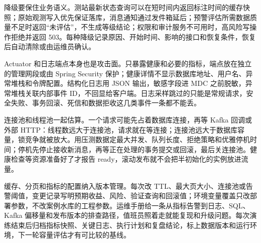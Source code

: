 降级要保住业务语义。测站最新状态查询可以在短时间内返回标注时间的缓存快照；原始观测写入优先保证落库，消息通知通过发件箱延后；预警评估所需数据质量不足时返回“未评估”，不生成等级结论；权限和审计服务不可用时，高风险写操作拒绝并返回 503。每种降级记录原因、开始时间、影响的接口和恢复条件，恢复后自动清除或由运维员确认。

Actuator 和日志端点本身也是攻击面。只暴露健康和必要的指标，端点放在独立的管理网段或由 Spring Security 保护；健康详情不显示数据库地址、用户名、异常堆栈和令牌配置。结构化日志用 JSON 输出，敏感字段进 MDC 之前脱敏，异常堆栈关联内部事件 ID，不回显给客户端。日志采样跳过的只能是常规请求，安全失败、事务回滚、死信和数据拒收这几类事件一条都不能丢。

连接池和线程池一起估算。一个请求可能先占着数据库连接，再等 Kafka 回调或外部 HTTP：线程数远大于连接池，请求就在等连接；连接池远大于数据库容量，锁竞争就被放大。用压测数据定最大并发、队列长度、拒绝策略和优雅停机时间；停机先停止接收新消息，再等正在处理的事务提交或回滚，最后关连接池。健康检查等资源准备好了才报告 ready，滚动发布就不会把半初始化的实例放进流量。

缓存、分页和指标的配置纳入版本管理。每次改 TTL、最大页大小、连接池或告警阈值，变更记录写明预期收益、风险、验证查询和回滚值；环境变量覆盖只改部署参数，不改案例水库的工程参数。运维手册给一条从指标告警到日志、SQL、Kafka 偏移量和发布版本的排查路径，值班员照着走就能复现和升级问题。每次演练结束后归档指标快照、关键日志、执行计划和复盘结论，标上数据版本和运行环境，下一轮容量评估才有可比较的基线。

